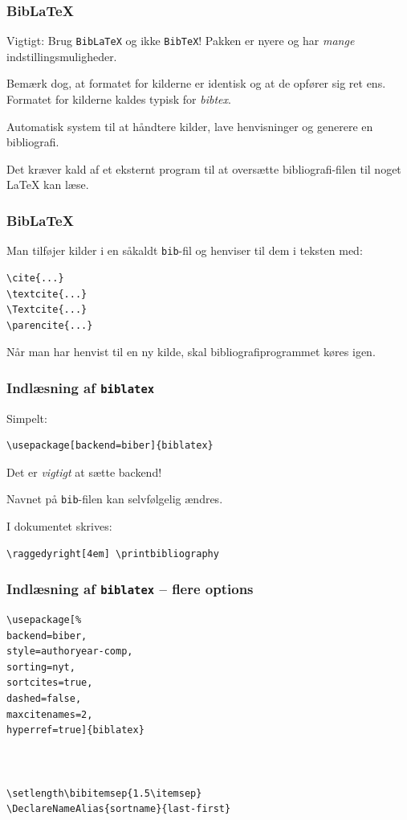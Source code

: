 \documentclass{beamer}
\newcommand{\plainbreak}[1]{\vspace{#1\baselineskip}}
\begin{document}
\begin{frame}
  \frametitle{BibLaTeX}

  Vigtigt: Brug \texttt{BibLaTeX} og ikke \texttt{BibTeX}! Pakken er nyere og
  har \emph{mange} indstillingsmuligheder.

  Bemærk dog, at formatet for kilderne er identisk og at de opfører sig ret ens.
  Formatet for kilderne kaldes typisk for \emph{bibtex}.

  \plainbreak1

  Automatisk system til at håndtere kilder, lave \alert{henvisninger} og
  generere en \alert{bibliografi}.

  Det kræver kald af et eksternt program til at oversætte bibliografi-filen til
  noget \LaTeX{} kan læse.

\end{frame}


\begin{frame}
  \frametitle{BibLaTeX}

  Man tilføjer kilder i en såkaldt \texttt{bib}-fil og henviser til dem i
  teksten med:
\begin{verbatim}
\cite{...}
\textcite{...}
\Textcite{...}
\parencite{...}
\end{verbatim}

  Når man har henvist til en ny kilde, skal bibliografiprogrammet køres igen.
\end{frame}


\begin{frame}
  \frametitle{Indlæsning af \texttt{biblatex}}

  Simpelt:
\begin{verbatim}
\usepackage[backend=biber]{biblatex}

\end{verbatim}

  Det er \emph{vigtigt} at sætte \alert{backend}!

  Navnet på \texttt{bib}-filen kan selvfølgelig ændres.

  \plainbreak1

  I dokumentet skrives:

\begin{verbatim}
\raggedyright[4em] \printbibliography
\end{verbatim}
\end{frame}


\begin{frame}[fragile]
  \frametitle{Indlæsning af \texttt{biblatex} -- flere options}

\begin{verbatim}
\usepackage[%
backend=biber,
style=authoryear-comp,
sorting=nyt,
sortcites=true,
dashed=false,
maxcitenames=2,
hyperref=true]{biblatex}



\setlength\bibitemsep{1.5\itemsep}
\DeclareNameAlias{sortname}{last-first}
\end{verbatim}
\end{frame}
\end{document}
